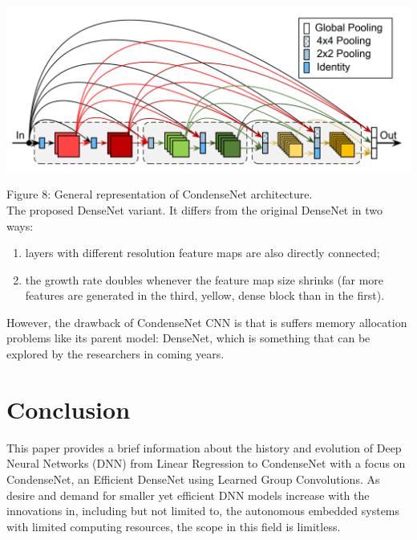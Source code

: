 \documentclass[conference]{IEEEtran}
\begin{document}
\begin{center}
    \includegraphics[scale=0.25]{CondenseNet2.PNG}\\
\end{center}
Figure 8: General representation of CondenseNet architecture. \cite{12}\\

The proposed DenseNet variant. It differs from the original DenseNet in two ways:
\begin{enumerate}
    \item layers with different resolution feature maps are also directly connected;
    \item the growth rate doubles whenever the feature map size shrinks (far more features are generated in the third, yellow, dense block than in the first).
\end{enumerate}

However, the drawback of CondenseNet CNN is that is suffers memory allocation problems like its parent model: DenseNet, which is something that can be explored by the researchers in coming years.

\section{\textbf{Conclusion}}
This paper provides a brief information about the history and evolution of Deep Neural Networks (DNN) from Linear Regression to CondenseNet with a focus on CondenseNet, an  Efficient  DenseNet  using  Learned Group  Convolutions. As desire and demand for smaller yet efficient DNN models increase with the innovations in, including but not limited to, the autonomous embedded systems with limited computing resources, the scope in this field is limitless.
\end{document}
